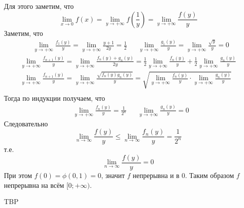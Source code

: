 \documentclass[12pt,a4paper]{article}
\begin{document}
\begin{enumproblem}
        Для этого заметим, что
        \[
            \lim_{x \to 0} f(x)
            = \lim_{y \to +\infty} f\left(\frac{1}{y}\right)
            = \lim_{y \to + \infty} \frac{f(y)}{y}
        \]
        Заметим, что
        \begin{align*}
            &\lim_{y \to +\infty} \frac{f_1(y)}{y} = \lim_{y \to +\infty} \frac{y + 1}{2y} = \frac{1}{2}&
            &\lim_{y \to +\infty} \frac{g_1(y)}{y} = \lim_{y \to +\infty} \frac{\sqrt{y}}{y} = 0
        \end{align*}
        \begin{gather*}
            \lim_{y \to +\infty} \frac{f_{n+1}(y)}{y} = \lim_{y \to +\infty} \frac{f_n(y) + g_n(y)}{2y} = \frac{1}{2} \lim_{y \to +\infty} \frac{f_n(y)}{y} + \frac{1}{2} \lim_{y \to +\infty} \frac{g_n(y)}{y}\\
            \lim_{y \to +\infty} \frac{f_{n+1}(y)}{y} = \lim_{y \to +\infty} \frac{\sqrt{f_n(y) g_n(y)}}{y} = \sqrt{\lim_{y \to +\infty} \frac{f_n(y)}{y} \cdot \lim_{y \to +\infty} \frac{g_n(y)}{y}}\\
        \end{gather*}
        Тогда по индукции получаем, что
        \begin{align*}
            &\lim_{y \to +\infty} \frac{f_n(y)}{y} = \frac{1}{2^n}&
            &\lim_{y \to +\infty} \frac{g_n(y)}{y} = 0
        \end{align*}
        Следовательно
        \[\lim_{n \to \infty} \frac{f(y)}{y} \leqslant \lim_{n \to \infty} \frac{f_n(y)}{y} = \frac{1}{2^n}\]
        т.е.
        \[\lim_{n \to \infty} \frac{f(y)}{y} = 0\]
        При этом $f(0) = \phi(0, 1) = 0$, значит $f$ непрерывна и в $0$. Таким образом $f$ непрерывна на всём $[0; +\infty)$.
    \end{enumproblem}

    \begin{enumproblem}
        TBP
    \end{enumproblem}
\end{document}
